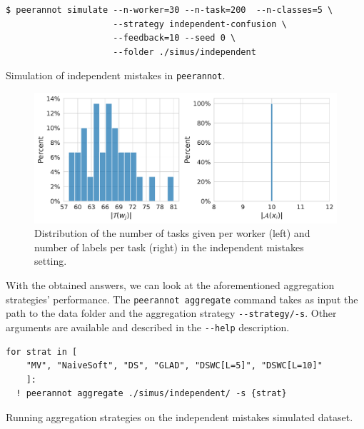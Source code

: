 \begin{listing}[H]
    \begin{verbatim}
$ peerannot simulate --n-worker=30 --n-task=200  --n-classes=5 \
                     --strategy independent-confusion \
                     --feedback=10 --seed 0 \
                     --folder ./simus/independent
    \end{verbatim}
    \caption{Simulation of independent mistakes in \texttt{peerannot}.}
    \label{lst:indep_mistakes}
\end{listing}

\begin{figure}[tbh]
    \centering
    \includegraphics[width=\textwidth]{./images_peerannot/fig-simu1-output-1.pdf}
    \caption{Distribution of the number of tasks given per worker (left) and number of labels per task (right) in the independent mistakes setting.}
    \label{fig:desc_independent}
\end{figure}

With the obtained answers, we can look at the aforementioned aggregation strategies' performance. The \texttt{peerannot aggregate} command takes as input the path to the data folder and the aggregation strategy \texttt{-{}-strategy/-s}. Other arguments are available and described in the \texttt{-{}-help} description.

\begin{listing}[H]
    \begin{verbatim}
for strat in [
    "MV", "NaiveSoft", "DS", "GLAD", "DSWC[L=5]", "DSWC[L=10]"
    ]:
  ! peerannot aggregate ./simus/independent/ -s {strat}
    \end{verbatim}
    \caption{Running aggregation strategies on the independent mistakes simulated dataset.}
    \label{lst:indep_mistakes_agg}
\end{listing}

